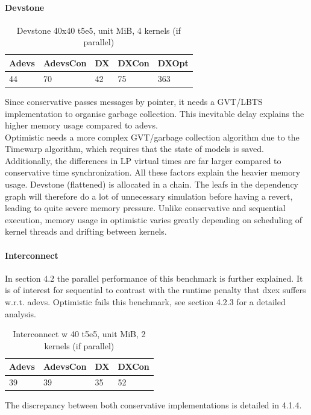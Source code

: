 \paragraph*{Devstone}
\begin{table}[lhtb]
	\centering
	\caption{Devstone 40x40 t5e5, unit MiB, 4 kernels (if parallel)}
	\label{dtone_mem}
	\begin{tabular}{| l | l | l | l | l |}
		\hline
		Adevs & AdevsCon &DX &DXCon &DXOpt\\ \hline
		44 & 70 & 42 & 75 & 363  \\ \hline
	\end{tabular}
\end{table}
Since conservative passes messages by pointer, it needs a GVT/LBTS implementation to organise garbage collection. This inevitable delay explains the higher memory usage compared to adevs.\\
Optimistic needs a more complex GVT/garbage collection algorithm due to the Timewarp algorithm, which requires that the state of models is saved. Additionally, the differences in LP virtual times are far larger compared to conservative time synchronization. All these factors explain the heavier memory usage. Devstone (flattened) is allocated in a chain. The leafs in the dependency graph will therefore do a lot of unnecessary simulation before having a revert, leading to quite severe memory pressure. Unlike conservative and sequential execution, memory usage in optimistic varies greatly depending on scheduling of kernel threads and drifting between kernels. 
\paragraph*{Interconnect}
In section 4.2 the parallel performance of this benchmark is further explained. It is of interest for sequential to contrast with the runtime penalty that dxex suffers w.r.t. adevs. Optimistic fails this benchmark, see section 4.2.3 for a detailed analysis.\\
\begin{table}[lhtb]
	\centering
	\caption{Interconnect w 40 t5e5, unit MiB, 2 kernels (if parallel)}
	\label{iconn_mem}
	\begin{tabular}{| l | l | l | l |}
		\hline
		Adevs & AdevsCon &DX &DXCon\\ \hline
		39 & 39 & 35 & 52  \\ \hline
	\end{tabular}
\end{table}
The discrepancy between both conservative implementations is detailed in 4.1.4.
		
